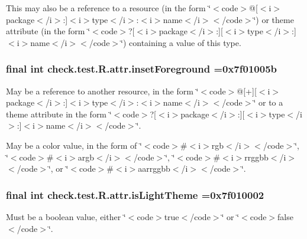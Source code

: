 This may also be a reference to a resource (in the form \char`\"{}$<$code$>$@\mbox{[}$<$i$>$package$<$/i$>$\+:\mbox{]}$<$i$>$type$<$/i$>$\+:$<$i$>$name$<$/i$>$$<$/code$>$\char`\"{}) or theme attribute (in the form \char`\"{}$<$code$>$?\mbox{[}$<$i$>$package$<$/i$>$\+:\mbox{]}\mbox{[}$<$i$>$type$<$/i$>$\+:\mbox{]}$<$i$>$name$<$/i$>$$<$/code$>$\char`\"{}) containing a value of this type. \hypertarget{classcheck_1_1test_1_1_r_1_1attr_adfd84b8f85801bd839c904634053b06f}{}
\subsubsection[{inset\+Foreground}]{\setlength{\rightskip}{0pt plus 5cm}final int check.\+test.\+R.\+attr.\+inset\+Foreground =0x7f01005b\hspace{0.3cm}{\ttfamily [static]}}\label{classcheck_1_1test_1_1_r_1_1attr_adfd84b8f85801bd839c904634053b06f}
May be a reference to another resource, in the form \char`\"{}$<$code$>$@\mbox{[}+\mbox{]}\mbox{[}$<$i$>$package$<$/i$>$\+:\mbox{]}$<$i$>$type$<$/i$>$\+:$<$i$>$name$<$/i$>$$<$/code$>$\char`\"{} or to a theme attribute in the form \char`\"{}$<$code$>$?\mbox{[}$<$i$>$package$<$/i$>$\+:\mbox{]}\mbox{[}$<$i$>$type$<$/i$>$\+:\mbox{]}$<$i$>$name$<$/i$>$$<$/code$>$\char`\"{}. 

May be a color value, in the form of \char`\"{}$<$code$>$\#$<$i$>$rgb$<$/i$>$$<$/code$>$\char`\"{}, \char`\"{}$<$code$>$\#$<$i$>$argb$<$/i$>$$<$/code$>$\char`\"{}, \char`\"{}$<$code$>$\#$<$i$>$rrggbb$<$/i$>$$<$/code$>$\char`\"{}, or \char`\"{}$<$code$>$\#$<$i$>$aarrggbb$<$/i$>$$<$/code$>$\char`\"{}. \hypertarget{classcheck_1_1test_1_1_r_1_1attr_a6c048dd7eef7fe7b77e391b95f7a1a93}{}
\subsubsection[{is\+Light\+Theme}]{\setlength{\rightskip}{0pt plus 5cm}final int check.\+test.\+R.\+attr.\+is\+Light\+Theme =0x7f010002\hspace{0.3cm}{\ttfamily [static]}}\label{classcheck_1_1test_1_1_r_1_1attr_a6c048dd7eef7fe7b77e391b95f7a1a93}
Must be a boolean value, either \char`\"{}$<$code$>$true$<$/code$>$\char`\"{} or \char`\"{}$<$code$>$false$<$/code$>$\char`\"{}. 

